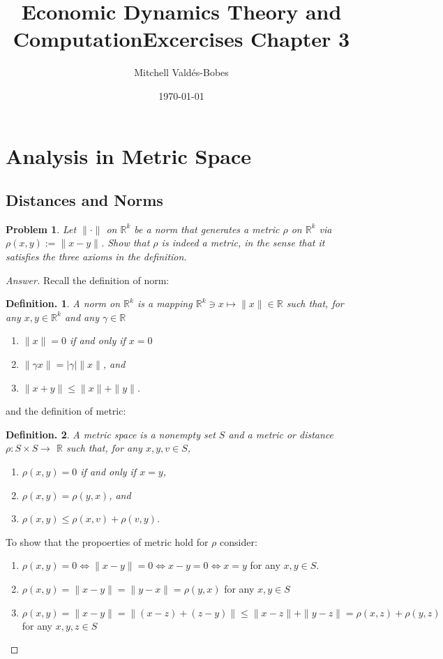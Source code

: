 \documentclass{article}
\title{Economic Dynamics Theory and Computation\newline Excercises Chapter 3}
\author{Mitchell Valdés-Bobes}
\date{\today}
\newtheorem{defin}{Definition.}
\newtheorem{problem}{Problem}
\begin{document}
\maketitle
\section{Analysis in Metric Space}

\subsection{Distances and Norms}
\begin{problem}
    Let $\|\cdot\|$ on $\mathbb{R}^{k}$ be a norm that generates a metric $\rho$ on $\mathbb{R}^{k}$ via $\rho(x, y):=\|x-y\|$. 
    Show that $\rho$ is indeed a metric, in the sense that it satisfies the three axioms in the definition.
\end{problem}

\begin{proof}[Answer]
    Recall the definition of norm:
    \begin{defin}
        A norm on $\mathbb{R}^{k}$ is a mapping $\mathbb{R}^{k} \ni x \mapsto\|x\| \in \mathbb{R}$ such that, for any $x, y \in \mathbb{R}^{k}$ and any $\gamma \in \mathbb{R}$
        \begin{enumerate}
            \item $\|x\|=0$ if and only if $x=0$
            \item $\|\gamma x\|=|\gamma|\|x\|$, and
            \item $\|x+y\| \leq\|x\|+\|y\|$.
        \end{enumerate}
    \end{defin}
    and the definition of metric:
    \begin{defin}
    A metric space is a nonempty set $S$ and a metric or distance $\rho: S \times S \rightarrow$ $\mathbb{R}$ such that, for any $x, y, v \in S$,
        \begin{enumerate}
            \item $\rho(x, y)=0$ if and only if $x=y$,
            \item $\rho(x, y)=\rho(y, x)$, and
            \item $\rho(x, y) \leq \rho(x, v)+\rho(v, y)$.
        \end{enumerate}
    \end{defin}

    To show that the propoerties of metric hold for $\rho$ consider:
    \begin{enumerate}
        \item $\rho(x,y)=0\iff\|x-y\|=0\iff x-y=0\iff x=y$  for any $x,y \in S$.
        \item $\rho(x,y)=\|x-y\|=\|y-x\|=\rho(y,x)$ for any $x,y \in S$
        \item $\rho(x,y)=\|x-y\|=\|(x-z)+(z-y)\|\leq\|x-z\|+ \|y-z\| = \rho(x,z) + \rho(y,z)$ for any $x,y,z\in S$
    \end{enumerate}

\end{proof}
\end{document}
